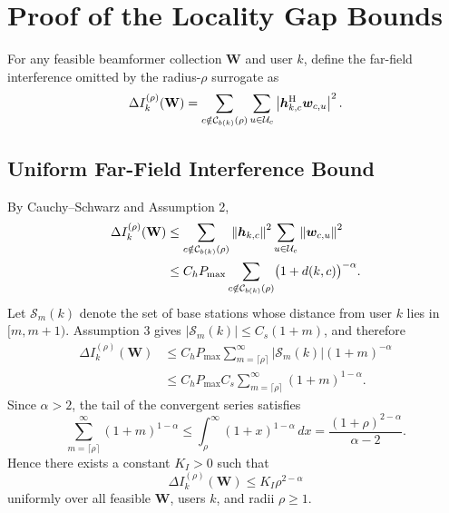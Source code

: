 \section{Proof of the Locality Gap Bounds}

For any feasible beamformer collection $\mathbf{W}$ and user $k$, define the far-field interference omitted by the radius-$\rho$ surrogate as
\begin{equation}
\Delta I_k^{(\rho)}(\mathbf{W}) =
\sum_{c \notin \mathcal{C}_{b(k)}(\rho)}
\sum_{u \in \mathcal{U}_c}
\left| \boldsymbol{h}_{k,c}^{\mathrm{H}} \boldsymbol{w}_{c,u} \right|^2.
\label{eq:far_field_def}
\end{equation}

\subsection{Uniform Far-Field Interference Bound}

By Cauchy--Schwarz and Assumption 2,
\begin{align}
\Delta I_k^{(\rho)}(\mathbf{W})
&\le
\sum_{c \notin \mathcal{C}_{b(k)}(\rho)}
\left\lVert \boldsymbol{h}_{k,c} \right\rVert^2
\sum_{u \in \mathcal{U}_c} \left\lVert \boldsymbol{w}_{c,u} \right\rVert^2 \nonumber \\
&\le
C_h P_{\max}
\sum_{c \notin \mathcal{C}_{b(k)}(\rho)}
\bigl(1 + d(k,c)\bigr)^{-\alpha}.
\label{eq:far_field_first}
\end{align}
Let $\mathcal{S}_m(k)$ denote the set of base stations whose distance from user $k$ lies in $[m,m+1)$. Assumption 3 gives $|\mathcal{S}_m(k)| \le C_s(1+m)$, and therefore
\begin{align}
\Delta I_k^{(\rho)}(\mathbf{W})
&\le
C_h P_{\max} \sum_{m=\lceil \rho \rceil}^{\infty}
|\mathcal{S}_m(k)| (1+m)^{-\alpha} \nonumber \\
&\le
C_h P_{\max} C_s
\sum_{m=\lceil \rho \rceil}^{\infty}
(1+m)^{1-\alpha}.
\end{align}
Since $\alpha > 2$, the tail of the convergent series satisfies
\begin{equation}
\sum_{m=\lceil \rho \rceil}^{\infty}
(1+m)^{1-\alpha}
\le
\int_{\rho}^{\infty} (1+x)^{1-\alpha}\,dx
=
\frac{(1+\rho)^{2-\alpha}}{\alpha - 2}.
\end{equation}
Hence there exists a constant $K_I > 0$ such that
\begin{equation}
\Delta I_k^{(\rho)}(\mathbf{W}) \le K_I \rho^{2-\alpha}
\label{eq:far_field_tail}
\end{equation}
uniformly over all feasible $\mathbf{W}$, users $k$, and radii $\rho \ge 1$.

